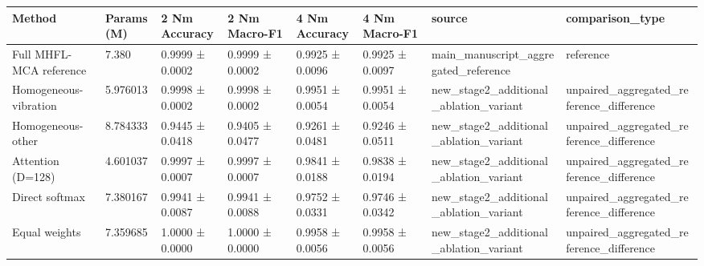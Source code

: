 \begin{tabular}{llllllll}
\toprule
                 Method & Params (M) &   2 Nm Accuracy &   2 Nm Macro-F1 &   4 Nm Accuracy &   4 Nm Macro-F1 &                                 source &                          comparison\_type \\
\midrule
Full MHFL-MCA reference &      7.380 & 0.9999 ± 0.0002 & 0.9999 ± 0.0002 & 0.9925 ± 0.0096 & 0.9925 ± 0.0097 &   main\_manuscript\_aggregated\_reference &                                reference \\
  Homogeneous-vibration &   5.976013 & 0.9998 ± 0.0002 & 0.9998 ± 0.0002 & 0.9951 ± 0.0054 & 0.9951 ± 0.0054 & new\_stage2\_additional\_ablation\_variant & unpaired\_aggregated\_reference\_difference \\
      Homogeneous-other &   8.784333 & 0.9445 ± 0.0418 & 0.9405 ± 0.0477 & 0.9261 ± 0.0481 & 0.9246 ± 0.0511 & new\_stage2\_additional\_ablation\_variant & unpaired\_aggregated\_reference\_difference \\
      Attention (D=128) &   4.601037 & 0.9997 ± 0.0007 & 0.9997 ± 0.0007 & 0.9841 ± 0.0188 & 0.9838 ± 0.0194 & new\_stage2\_additional\_ablation\_variant & unpaired\_aggregated\_reference\_difference \\
         Direct softmax &   7.380167 & 0.9941 ± 0.0087 & 0.9941 ± 0.0088 & 0.9752 ± 0.0331 & 0.9746 ± 0.0342 & new\_stage2\_additional\_ablation\_variant & unpaired\_aggregated\_reference\_difference \\
          Equal weights &   7.359685 & 1.0000 ± 0.0000 & 1.0000 ± 0.0000 & 0.9958 ± 0.0056 & 0.9958 ± 0.0056 & new\_stage2\_additional\_ablation\_variant & unpaired\_aggregated\_reference\_difference \\
\bottomrule
\end{tabular}
